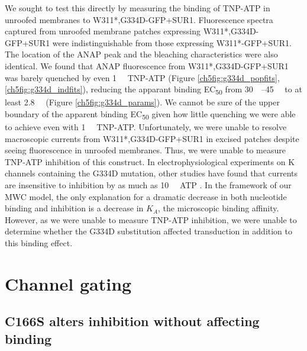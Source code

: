 We sought to test this directly by measuring the binding of TNP-ATP in unroofed membranes to W311*,G334D-GFP+SUR1.
Fluorescence spectra captured from unroofed membrane patches expressing W311*,G334D-GFP+SUR1 were indistinguishable from those expressing W311*-GFP+SUR1.
The location of the ANAP peak and the bleaching characteristics were also identical.
We found that ANAP fluorescence from W311*,G334D-GFP+SUR1 was barely quenched by even \SI{1}{\milli\Molar} TNP-ATP (Figure \ref{ch5fig:g334d_popfits}, \ref{ch5fig:g334d_indfits}), reducing the apparant binding EC\textsubscript{50} from \SIrange{30}{45}{\micro\Molar} to at least \SI{2.8}{\milli\Molar} (Figure \ref{ch5fig:g334d_params}).
We cannot be sure of the upper boundary of the apparent binding EC\textsubscript{50} given how little quenching we were able to achieve even with \SI{1}{\milli\Molar} TNP-ATP.
Unfortunately, we were unable to resolve macroscopic currents from W311*,G334D-GFP+SUR1 in excised patches despite seeing fluorescence in unroofed membranes.
Thus, we were unable to measure TNP-ATP inhibition of this construct.
In electrophysiological experiments on K\ATP{} channels containing the G334D mutation, other studies have found that currents are insensitive to inhibition by as much as \SI{10}{\milli\Molar} ATP \cite{drain_katp_1998, masia_atp-binding_2007-1}.
In the framework of our MWC model, the only explanation for a dramatic decrease in both nucleotide binding and inhibition is a decrease in $K_A$, the microscopic binding affinity.
However, as we were unable to measure TNP-ATP inhibition, we were unable to determine whether the G334D substitution affected transduction in addition to this binding effect.

\section{Channel gating}

\subsection{C166S alters inhibition without affecting binding}

